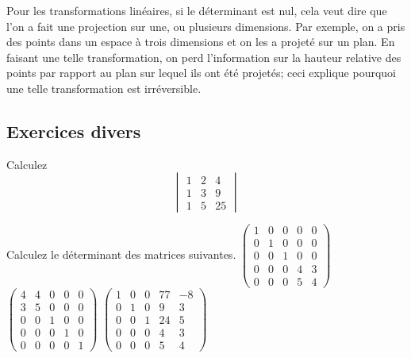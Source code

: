 Pour les transformations linéaires, si le déterminant est nul, cela veut dire que l'on
a fait une projection sur une, ou plusieurs dimensions.  Par exemple, on a pris des points
dans un espace à trois dimensions et on les a projeté sur un plan.  
En faisant une telle transformation, on perd l'information sur la hauteur relative des points
par rapport au plan sur lequel ils ont été projetés; ceci explique pourquoi une telle transformation
est irréversible.

\begin{TwoCol}
\section{Exercices divers}

\begin{exercice}\label{ex:vandermonde} Calculez
\[
\begin{vmatrix}
1 & 2 & 4 \\
1 & 3 & 9 \\
1 & 5 & 25
\end{vmatrix}
\]
\end{exercice}
\begin{exercice} \label{ex:explicit}
Calculez le déterminant des matrices suivantes.
$\displaystyle \begin{pmatrix}
1 & 0 & 0 & 0 & 0 \\
0 & 1 & 0 & 0 & 0 \\
0 & 0 & 1 & 0 & 0 \\
0 & 0 & 0 & 4 & 3 \\
0 & 0 & 0 & 5 & 4
\end{pmatrix}$
$\displaystyle \begin{pmatrix}
4 & 4 & 0 & 0 & 0 \\
3 & 5 & 0 & 0 & 0 \\
0 & 0 & 1 & 0 & 0 \\
0 & 0 & 0 & 1 & 0 \\
0 & 0 & 0 & 0 & 1
\end{pmatrix}$
$\displaystyle \begin{pmatrix}
1 & 0 & 0 & 77 & -8 \\
0 & 1 & 0 & 9 & 3 \\
0 & 0 & 1 & 24 & 5 \\
0 & 0 & 0 & 4 & 3 \\
0 & 0 & 0 & 5 & 4
\end{pmatrix}$
\end{exercice}
\begin{exercice}

\end{exercice}
\end{TwoCol}
